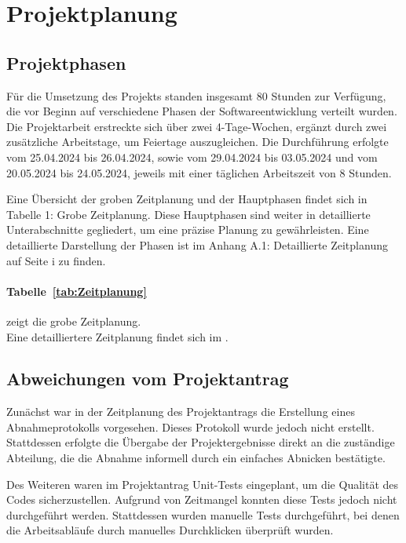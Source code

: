 \section{Projektplanung} 
\label{sec:Projektplanung}


\subsection{Projektphasen}
\label{sec:Projektphasen}

Für die Umsetzung des Projekts standen insgesamt 80 Stunden zur Verfügung, die vor Beginn auf verschiedene Phasen der Softwareentwicklung verteilt wurden. Die Projektarbeit erstreckte sich über zwei 4-Tage-Wochen, ergänzt durch zwei zusätzliche Arbeitstage, um Feiertage auszugleichen. Die Durchführung erfolgte vom 25.04.2024 bis 26.04.2024, sowie vom 29.04.2024 bis 03.05.2024 und vom 20.05.2024 bis 24.05.2024, jeweils mit einer täglichen Arbeitszeit von 8 Stunden.

Eine Übersicht der groben Zeitplanung und der Hauptphasen findet sich in Tabelle 1: Grobe Zeitplanung. Diese Hauptphasen sind weiter in detaillierte Unterabschnitte gegliedert, um eine präzise Planung zu gewährleisten. Eine detaillierte Darstellung der Phasen ist im Anhang A.1: Detaillierte Zeitplanung auf Seite i zu finden.

\paragraph{Tabelle~\ref{tab:Zeitplanung}} zeigt die grobe Zeitplanung.
\\
Eine detailliertere Zeitplanung findet sich im .


\subsection{Abweichungen vom Projektantrag}
\label{sec:AbweichungenProjektantrag}

Zunächst war in der Zeitplanung des Projektantrags die Erstellung eines Abnahmeprotokolls vorgesehen. Dieses Protokoll wurde jedoch nicht erstellt. Stattdessen erfolgte die Übergabe der Projektergebnisse direkt an die zuständige Abteilung, die die Abnahme informell durch ein einfaches Abnicken bestätigte.

Des Weiteren waren im Projektantrag Unit-Tests eingeplant, um die Qualität des Codes sicherzustellen. Aufgrund von Zeitmangel konnten diese Tests jedoch nicht durchgeführt werden. Stattdessen wurden manuelle Tests durchgeführt, bei denen die Arbeitsabläufe durch manuelles Durchklicken überprüft wurden.

